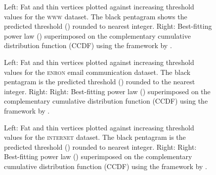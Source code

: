 \documentclass{article}
\theoremstyle{remark}
\begin{document}
\begin{figure}[!ht]
\centering
{}\caption{Left: Fat and thin vertices plotted against increasing threshold values for the \textsc{www} dataset. The black pentagram shows the predicted threshold () rounded to nearest integer. Right: Best-fitting power law () superimposed on the complementary cumulative distribution function (CCDF) using the framework by \cite{clauset2009power}.} \label{fig:www}\end{figure}

\begin{figure}[!ht]
\centering
{}\caption{Left: Fat and thin vertices plotted against increasing threshold values for the \textsc{enron} email communication dataset. The black pentagram is the predicted threshold () rounded to the nearest integer. Right: Right: Best-fitting power law ()  superimposed on the complementary cumulative distribution function (CCDF) using the framework by \cite{clauset2009power}.}
\label{fig:enron}\end{figure}

\begin{figure}[!ht]
\centering
{}\caption{Left: Fat and thin vertices plotted against increasing threshold values for the \textsc{internet} dataset. The black pentagram is the predicted threshold () rounded to nearest integer. Right: Right: Best-fitting power law () superimposed on the complementary cumulative distribution function (CCDF) using the framework by \cite{clauset2009power}.} \label{fig:internet}\end{figure}
\end{document}
